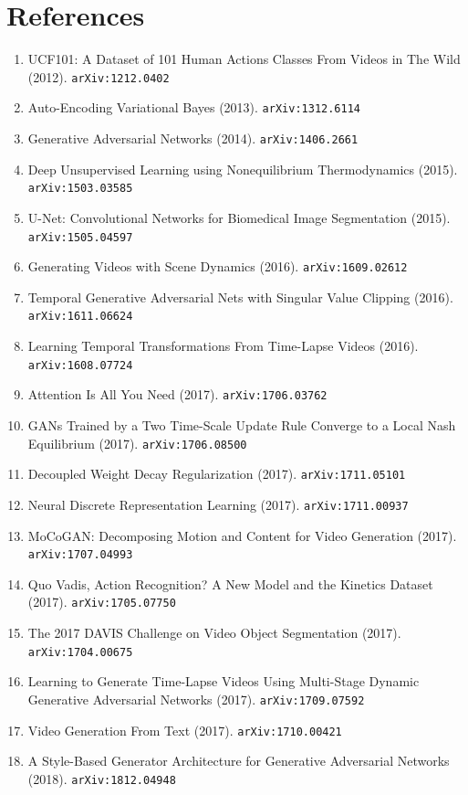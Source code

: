 \documentclass[11pt]{article}
\begin{document}
\section*{References}
\begin{enumerate}\small
  \item UCF101: A Dataset of 101 Human Actions Classes From Videos in The Wild (2012). \texttt{arXiv:1212.0402}
  \item Auto-Encoding Variational Bayes (2013). \texttt{arXiv:1312.6114}
  \item Generative Adversarial Networks (2014). \texttt{arXiv:1406.2661}
  \item Deep Unsupervised Learning using Nonequilibrium Thermodynamics (2015). \texttt{arXiv:1503.03585}
  \item U-Net: Convolutional Networks for Biomedical Image Segmentation (2015). \texttt{arXiv:1505.04597}
  \item Generating Videos with Scene Dynamics (2016). \texttt{arXiv:1609.02612}
  \item Temporal Generative Adversarial Nets with Singular Value Clipping (2016). \texttt{arXiv:1611.06624}
  \item Learning Temporal Transformations From Time-Lapse Videos (2016). \texttt{arXiv:1608.07724}
  \item Attention Is All You Need (2017). \texttt{arXiv:1706.03762}
  \item GANs Trained by a Two Time-Scale Update Rule Converge to a Local Nash
  Equilibrium (2017). \texttt{arXiv:1706.08500}
  \item Decoupled Weight Decay Regularization (2017). \texttt{arXiv:1711.05101}
  \item Neural Discrete Representation Learning (2017). \texttt{arXiv:1711.00937}
  \item MoCoGAN: Decomposing Motion and Content for Video Generation (2017). \texttt{arXiv:1707.04993}
  \item Quo Vadis, Action Recognition? A New Model and the Kinetics Dataset (2017). \texttt{arXiv:1705.07750}
  \item The 2017 DAVIS Challenge on Video Object Segmentation (2017). \texttt{arXiv:1704.00675}
  \item Learning to Generate Time-Lapse Videos Using Multi-Stage Dynamic
  Generative Adversarial Networks (2017). \texttt{arXiv:1709.07592}
  \item Video Generation From Text (2017). \texttt{arXiv:1710.00421}
  \item A Style-Based Generator Architecture for Generative Adversarial Networks (2018). \texttt{arXiv:1812.04948}

\end{enumerate}
\end{document}
